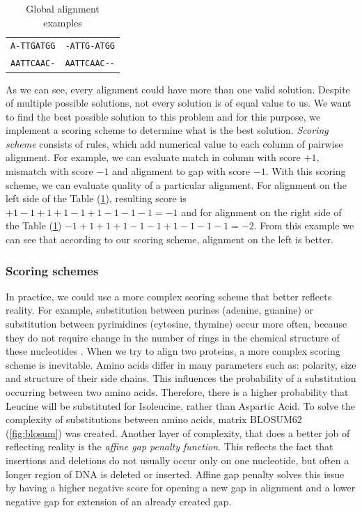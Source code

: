 \begin{table}
  \centering
	\begin{tabular}{ l | r }
	\verb|A-TTGATGG| & \verb|-ATTG-ATGG| \\
	\verb|AATTCAAC-| & \verb|AATTCAAC--| \\
	\end{tabular}
  \caption{Global alignment examples}
  \label{tab:potsol}
\end{table}

As we can see, every alignment could have more than one valid solution.
Despite of multiple possible solutions, not every solution is of equal value to us.
We want to find the best possible solution to this problem and for this purpose, we implement a scoring scheme to determine what is the best solution.
\emph{Scoring scheme} consists of rules, which add numerical value to each column of pairwise alignment.
For example, we can evaluate match in column with score $+1$, mismatch with score $-1$ and alignment to gap with score $-1$.
With this scoring scheme, we can evaluate quality of a particular alignment.
For alignment on the left side of the Table (\ref{tab:potsol}), resulting score is $+1-1+1+1-1+1-1-1-1 = -1$ and for alignment on the right side of the Table (\ref{tab:potsol}) $-1+1+1+1-1-1+1-1-1-1 = -2$.
From this example we can see that according to our scoring scheme, alignment on the left is better.

\subsubsection{Scoring schemes}
In practice, we could use a more complex scoring scheme that better reflects reality.
For example, substitution between purines (adenine, guanine) or substitution between pyrimidines (cytosine, thymine) occur more often, because they do not require change in the number of rings in the chemical structure of these nucleotides \cite{transition}.
When we try to align two proteins, a more complex scoring scheme is inevitable.
Amino acids differ in many parameters such as: polarity, size and structure of their side chains.
This influences the probability of a substitution occurring between two amino acids.
Therefore, there is a higher probability that Leucine will be substituted for Isoleucine, rather than Aspartic Acid.
To solve the complexity of substitutions between amino acids, matrix BLOSUM62 (\ref{fig:blosum}) was created.
Another layer of complexity, that does a better job of reflecting reality is the \emph{affine gap penalty function}.
This reflects the fact that insertions and deletions do not usually occur only on one nucleotide, but often a longer region of DNA is deleted or inserted.
Affine gap penalty solves this issue by having a higher negative score for opening a new gap in alignment and a lower negative gap for extension of an already created gap.

